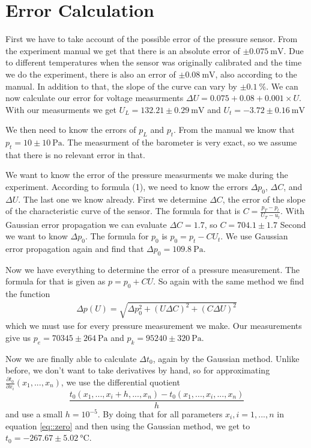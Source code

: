 \section{Error Calculation}
First we have to take account of the possible error of the pressure sensor. From the experiment manual we get that there is an absolute error of $\pm\SI{0.075}{\milli\volt}$.
Due to different temperatures when the sensor was originally calibrated and the time we do the experiment, there is also an error of $\pm\SI{0.08}{\milli\volt}$, also according to the manual. 
In addition to that, the slope of the curve can vary by $\pm\SI{0.1}{\percent}$. 
We can now calculate our error for voltage measurments $\Delta U = 0.075 + 0.08 + 0.001 \times U$. 
With our measurments we get $U_L = 132.21 \pm \SI{0.29}{\milli\volt}$ and $U_t = -3.72 \pm \SI{0.16}{\milli\volt}$

We then need to know the errors of $p_L$ and $p_t$. 
From the manual we know that $p_t = 10 \pm \SI{10}{\pascal}$.
The measurment of the barometer is very exact, so we assume that there is no relevant error in that. 

We want to know the error of the pressure measurments we make during the experiment. 
According to formula (1), we need to know the errors $\Delta p_0$, $\Delta C$, and $\Delta U$. 
The last one we know already.
First we determine $\Delta C$, the error of the slope of the characteristic curve of the sensor. 
The formula for that is $C = \frac{p_T - p_l}{U_T - u_l}$. With Gaussian error propagation we can evaluate $\Delta C = 1.7$, so $C = 704.1 \pm 1.7$
Second we want to know $\Delta p_0$. 
The formula for $p_0$ is $p_0 = p_t - C U_t$.
We use Gaussian error propagation again and find that $\Delta p_0 = \SI{109.8}{\pascal}$.

Now we have everything to determine the error of a pressure measurement. 
The formula for that is given as $p = p_0 + C U$. 
So again with the same method we find the function 
\begin{align}
	\Delta p(U) = \sqrt{\Delta p_0^2 + (U \Delta C)^2 + (C \Delta U)^2}
\end{align}\label{eq:err1}
which we must use for every pressure measurement we make. 
Our measurements give us $p_e = 70345 \pm \SI{264}{\pascal}$ and $p_k = 95240 \pm \SI{320}{\pascal}$.

Now we are finally able to calculate $\Delta t_0$, again by the Gaussian method. 
Unlike before, we don't want to take derivatives by hand, so for approximating $\frac{\partial t_0}{\partial x_i}(x_1, ..., x_n)$, we use the differential quotient
\[ \frac{t_0(x_1,..., x_i+h,...,x_n) - t_0(x_1,..., x_i,...,x_n)}{h} \]
 and use a small $h = 10^{-5}$. By doing that for all parameters $x_i, i = 1,...,n$
in equation \ref{eq::zero} and then using the Gaussian method, we get to $t_0 = -267.67 \pm \SI{5.02}{\degreeCelsius}$.